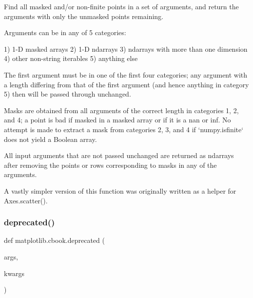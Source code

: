 \begin{DoxyVerb}Find all masked and/or non-finite points in a set of arguments,
and return the arguments with only the unmasked points remaining.

Arguments can be in any of 5 categories:

1) 1-D masked arrays
2) 1-D ndarrays
3) ndarrays with more than one dimension
4) other non-string iterables
5) anything else

The first argument must be in one of the first four categories;
any argument with a length differing from that of the first
argument (and hence anything in category 5) then will be
passed through unchanged.

Masks are obtained from all arguments of the correct length
in categories 1, 2, and 4; a point is bad if masked in a masked
array or if it is a nan or inf.  No attempt is made to
extract a mask from categories 2, 3, and 4 if `numpy.isfinite`
does not yield a Boolean array.

All input arguments that are not passed unchanged are returned
as ndarrays after removing the points or rows corresponding to
masks in any of the arguments.

A vastly simpler version of this function was originally
written as a helper for Axes.scatter().\end{DoxyVerb}
 \mbox{\label{namespacematplotlib_1_1cbook_a5979ec40652233aee2a34f04e209e935}} 
\subsubsection{\texorpdfstring{deprecated()}{deprecated()}}
{\footnotesize\ttfamily def matplotlib.\+cbook.\+deprecated (\begin{DoxyParamCaption}\item[{}]{args,  }\item[{}]{kwargs }\end{DoxyParamCaption})}

\mbox{\label{namespacematplotlib_1_1cbook_a8e8aef949d3d004b55e40b5cec88fa0a}} 
